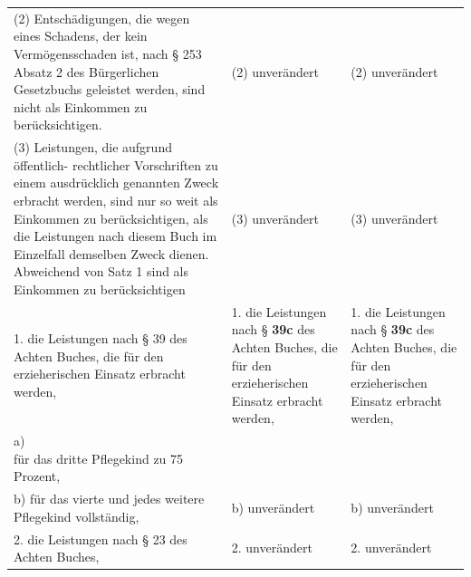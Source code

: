 \documentclass[10pt,a4paper,landscape]{article}
\begin{document}
\begin{longtable}{|L{8.2cm}|L{8.2cm}|L{8.2cm}|}
\hhline{|---|}
(2) Entschädigungen, die wegen eines  \newline Schadens, der kein Vermögensschaden ist,  \newline nach \S{} 253 Absatz 2 des Bürgerlichen  \newline Gesetzbuchs geleistet werden, sind nicht  \newline als Einkommen zu berücksichtigen. & (2) unverändert & (2) unverändert \\
\hhline{|---|}
(3) Leistungen, die aufgrund öffentlich- \newline rechtlicher Vorschriften zu einem  \newline ausdrücklich genannten Zweck erbracht  \newline werden, sind nur so weit als Einkommen zu  \newline berücksichtigen, als die Leistungen nach  \newline diesem Buch im Einzelfall demselben  \newline Zweck dienen. Abweichend von Satz 1 sind  \newline als Einkommen zu berücksichtigen & (3) unverändert & (3) unverändert \\
\hhline{|---|}
1.   \newline die Leistungen nach \S{} \textcolor{diffred}{39} des Achten  \newline Buches, die für den erzieherischen Einsatz  \newline erbracht werden, & 1.   \newline die Leistungen nach \S{} \textbf{39c} des Achten  \newline Buches, die für den erzieherischen Einsatz  \newline erbracht werden, & 1.   \newline die Leistungen nach \S{} \textbf{39c} des Achten  \newline Buches, die für den erzieherischen Einsatz  \newline erbracht werden, \\
\hhline{|---|}
\textcolor{diffred}{a)  \newline für das dritte Pflegekind zu 75 Prozent, } &  &  \\
\hhline{|---|}
b)  \newline für das vierte und jedes weitere Pflegekind  \newline vollständig, & b) unverändert & b) unverändert \\
\hhline{|---|}
2.   \newline die Leistungen nach \S{} 23 des Achten  \newline Buches, & 2. unverändert & 2. unverändert \\

\end{longtable}
\end{document}
